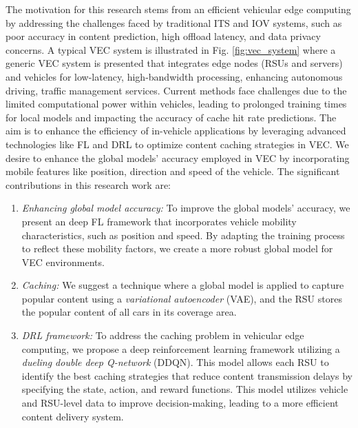 \documentclass[journal]{IEEEtran}
\begin{document}
The motivation for this research stems from an efficient vehicular edge computing by addressing the challenges faced by traditional ITS and IOV systems, such as poor accuracy in content prediction, high offload latency, and data privacy concerns. A typical VEC system is illustrated in Fig. \ref{fig:vec_system} where a generic VEC system is presented that integrates edge nodes (RSUs and servers) and vehicles for low-latency, high-bandwidth processing, enhancing autonomous driving, traffic management services. Current methods face challenges due to the limited computational power within vehicles, leading to prolonged training times for local models and impacting the accuracy of cache hit rate predictions.
The aim is to enhance the efficiency of in-vehicle applications by leveraging advanced technologies like FL and DRL to optimize content caching strategies in VEC. We desire to enhance the global models' accuracy employed in VEC by incorporating mobile features like position, direction and speed of the vehicle. 
The significant contributions in this research work are:\para 
\begin{enumerate}
\item \textit{Enhancing global model accuracy:} To improve the global models' accuracy, we present an deep FL framework that incorporates vehicle mobility characteristics, such as position and speed. By adapting the training process to reflect these mobility factors, we create a more robust global model for VEC environments.


\item \textit{Caching:} We suggest a technique where a global model is applied to capture popular content using a \textit{variational autoencoder} (VAE), and the RSU stores the popular content of all cars in its coverage area.


\item \textit{DRL framework:} To address the caching problem in vehicular edge computing, we propose a deep reinforcement learning framework utilizing a \textit{dueling double deep Q-network }(DDQN). This model allows each RSU to identify the best caching strategies that reduce content transmission delays by specifying the state, action, and reward functions. This model utilizes vehicle and RSU-level data to improve decision-making, leading to a more efficient content delivery system.
\end{enumerate}
\end{document}
